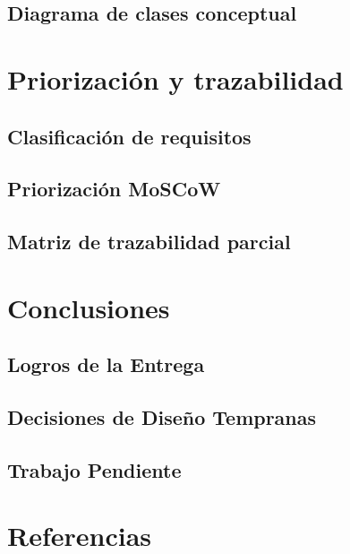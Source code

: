 \documentclass[11pt,a4paper]{article}
\begin{document}
\subsection{Diagrama de clases conceptual}

\section{Priorización y trazabilidad}



\subsection{Clasificación de requisitos}



\subsection{Priorización MoSCoW}


\subsection{Matriz de trazabilidad parcial}



\section{Conclusiones}
\subsection{Logros de la Entrega}


\subsection{Decisiones de Diseño Tempranas}


\subsection{Trabajo Pendiente}


\section*{Referencias}
\end{document}
